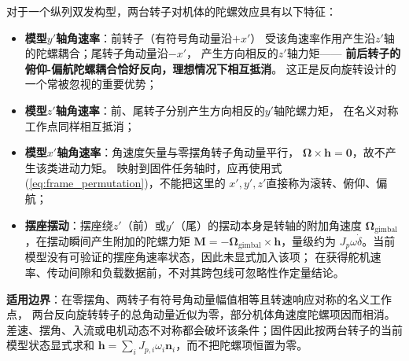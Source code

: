 对于一个纵列双发构型，两台转子对机体的陀螺效应具有以下特征：
\begin{itemize}
    \item \textbf{模型$y'$轴角速率}：前转子（有符号角动量沿$+x'$）
          受该角速率作用产生沿$z'$轴的陀螺耦合；尾转子角动量沿$-x'$，
          产生方向相反的$z'$轴力矩——
          \textbf{前后转子的俯仰-偏航陀螺耦合恰好反向，理想情况下相互抵消}。
          这正是反向旋转设计的一个常被忽视的重要优势；
    \item \textbf{模型$z'$轴角速率}：前、尾转子分别产生方向相反的$y'$轴陀螺力矩，
          在名义对称工作点同样相互抵消；
    \item \textbf{模型$x'$轴角速率}：角速度矢量与零摆角转子角动量平行，
          $\bm{\Omega} \times \bm{h}=\bm 0$，故不产生该类进动力矩。
          映射到固件任务轴时，应再使用式(\ref{eq:frame_permutation})，不能把这里的
          $x',y',z'$直接称为滚转、俯仰、偏航；
    \item \textbf{摆座摆动}：摆座绕$z'$（前）或$y'$（尾）的摆动本身是转轴的附加角速度
          $\bm{\Omega}_{\text{gimbal}}$，在摆动瞬间产生附加的陀螺力矩
          $\bm{M} = -\bm{\Omega}_{\text{gimbal}} \times \bm{h}$，量级约为
          $J_p \omega \dot{\delta}$。当前模型没有可验证的摆座角速率状态，因此未显式加入该项；
          在获得舵机速率、传动间隙和负载数据前，不对其跨包线可忽略性作定量结论。
\end{itemize}

\textbf{适用边界}：在零摆角、两转子有符号角动量幅值相等且转速响应对称的名义工作点，
两台反向旋转转子的总角动量近似为零，部分机体角速度陀螺项因而相消。
差速、摆角、入流或电机动态不对称都会破坏该条件；固件因此按两台转子的当前模型状态显式求和
$\bm h=\sum_i J_{p,i}\omega_i\bm n_i$，而不把陀螺项恒置为零。
